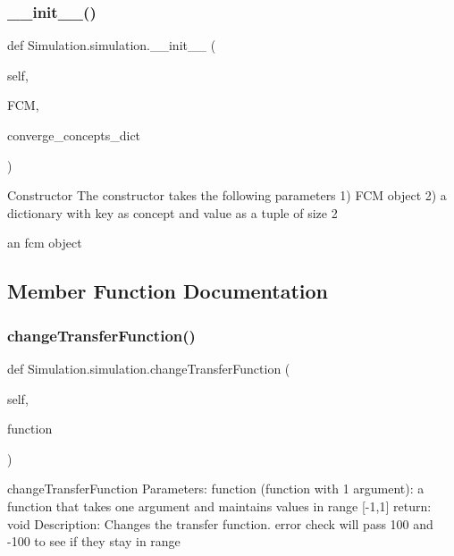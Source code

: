 \subsubsection{\texorpdfstring{\+\_\+\+\_\+init\+\_\+\+\_\+()}{\_\_init\_\_()}}
{\footnotesize\ttfamily def Simulation.\+simulation.\+\_\+\+\_\+init\+\_\+\+\_\+ (\begin{DoxyParamCaption}\item[{}]{self,  }\item[{}]{F\+CM,  }\item[{}]{converge\+\_\+concepts\+\_\+dict }\end{DoxyParamCaption})}

\begin{DoxyVerb}Constructor
The constructor takes the following parameters
1) FCM object
2) a dictionary with key as concept and value as a tuple of size 2
\end{DoxyVerb}
\begin{DoxyVerb}an fcm object \end{DoxyVerb}
 

\subsection{Member Function Documentation}
\hypertarget{class_simulation_1_1simulation_a6de2037ab28f1fd076cadeb95f1e83fa}{}\label{class_simulation_1_1simulation_a6de2037ab28f1fd076cadeb95f1e83fa} 
\subsubsection{\texorpdfstring{change\+Transfer\+Function()}{changeTransferFunction()}}
{\footnotesize\ttfamily def Simulation.\+simulation.\+change\+Transfer\+Function (\begin{DoxyParamCaption}\item[{}]{self,  }\item[{}]{function }\end{DoxyParamCaption})}

\begin{DoxyVerb}changeTransferFunction
Parameters: function (function with 1 argument): a function that takes one argument and maintains values in range [-1,1]
return: void
Description: Changes the transfer function. error check will pass 100 and -100  to see if they stay in range
\end{DoxyVerb}
 \hypertarget{class_simulation_1_1simulation_a2f32f5da01e7f1485510f5982be2860c}{}\label{class_simulation_1_1simulation_a2f32f5da01e7f1485510f5982be2860c} 
